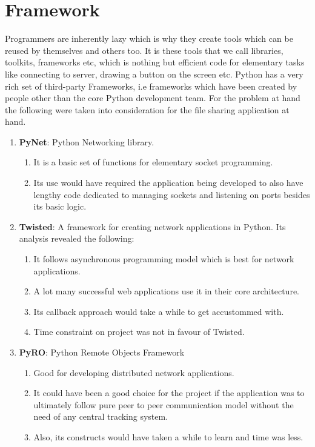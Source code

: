 \section {Framework}
\label{sec:PyQt}
Programmers are inherently lazy which is why they create tools which can be reused by themselves and others too. It is these tools that we call libraries, toolkits, frameworks etc, which is nothing but efficient code for elementary tasks like connecting to server, drawing a button on the screen etc. Python has a very rich set of third-party Frameworks, i.e frameworks which have been created by people other than the core Python development team. For the problem at hand the following were taken into consideration for the file sharing application at hand.
\begin{enumerate}
\item \textbf{PyNet}: Python Networking library.
  \begin{enumerate}
  \item It is a basic set of functions for elementary socket programming.
  \item Its use would have required the application being developed to also have lengthy code dedicated to managing sockets and listening on ports besides its basic logic.
  \end{enumerate}

\item \textbf{Twisted}: A framework for creating network applications in Python. Its analysis revealed the following:
  \begin{enumerate}
  \item It follows asynchronous programming model which is best for network applications.
  \item A lot many successful web applications use it in their core architecture.
  \item Its callback approach would take a while to get accustommed with.
  \item Time constraint on project was not in favour of Twisted.
  \end{enumerate}

\item \textbf{PyRO}: Python Remote Objects Framework
  \begin{enumerate}
  \item Good for developing distributed network applications.
  \item It could have been a good choice for the project if the application was to ultimately follow pure peer to peer communication model without the need of any central tracking system.
  \item Also, its constructs would have taken a while to learn and time was less.
  \end{enumerate}


\end{enumerate}
